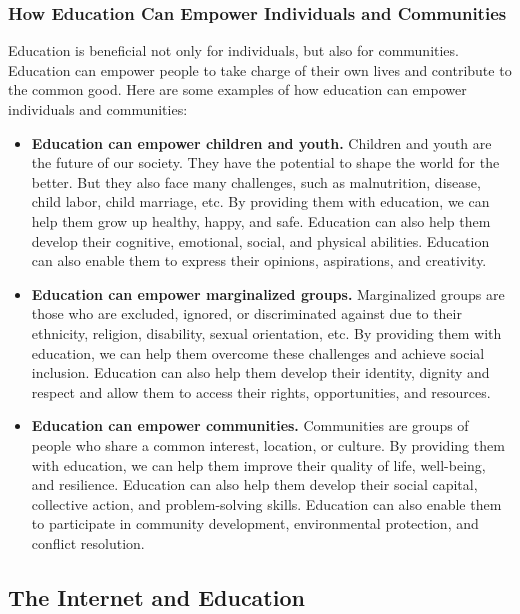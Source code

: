 \documentclass[a4paper,11pt]{article}
\begin{document}
\subsubsection{How Education Can Empower Individuals and Communities}

Education is beneficial not only for individuals, but also for communities. Education can empower people to take charge of their own lives and contribute to the common good. Here are some examples of how education can empower individuals and communities:

\begin{itemize}
	\item \textbf{Education can empower children and youth.}
	 Children and youth are the future of our society. They have the potential to shape the world for the better. But they also face many challenges, such as malnutrition, disease, child labor, child marriage, etc. By providing them with education, we can help them grow up healthy, happy, and safe. Education can also help them develop their cognitive, emotional, social, and physical abilities. Education can also enable them to express their opinions, aspirations, and creativity.
	\item \textbf{Education can empower marginalized groups.}
	 Marginalized groups are those who are excluded, ignored, or discriminated against due to their ethnicity, religion, disability, sexual orientation, etc. By providing them with education, we can help them overcome these challenges and achieve social inclusion. Education can also help them develop their identity, dignity and respect and allow them to access their rights, opportunities, and resources.
	\item \textbf{Education can empower communities.}
	 Communities are groups of people who share a common interest, location, or culture. By providing them with education, we can help them improve their quality of life, well-being, and resilience. Education can also help them develop their social capital, collective action, and problem-solving skills. Education can also enable them to participate in community development, environmental protection, and conflict resolution.
\end{itemize}



\subsection{The Internet and Education} 
\end{document}
